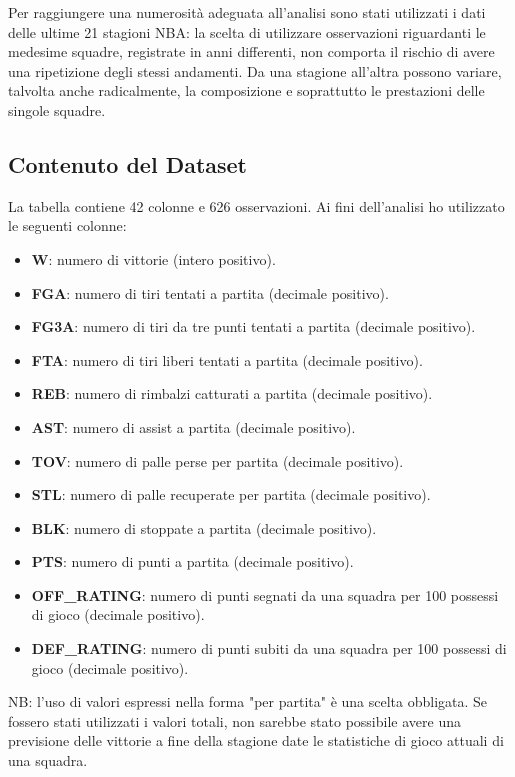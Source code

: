 \documentclass[11pt,a4paper]{article}
\begin{document}
Per raggiungere una numerosità adeguata all'analisi sono stati utilizzati i dati delle ultime 21 stagioni NBA: la scelta di utilizzare osservazioni riguardanti le medesime squadre, registrate in anni differenti, non comporta il rischio di avere una ripetizione degli stessi andamenti. Da una stagione all'altra possono variare, talvolta anche radicalmente, la composizione e soprattutto le prestazioni delle singole squadre. 

\subsection{Contenuto del Dataset}
La tabella contiene 42 colonne e 626 osservazioni. Ai fini dell'analisi ho utilizzato le seguenti colonne:
\begin{itemize}
    \item \textbf{W}: numero di vittorie (intero positivo).
    \item \textbf{FGA}: numero di tiri tentati a partita (decimale positivo).
    \item \textbf{FG3A}: numero di tiri da tre punti tentati a partita (decimale positivo).
    \item \textbf{FTA}: numero di tiri liberi tentati a partita (decimale positivo).
    \item \textbf{REB}: numero di rimbalzi catturati a partita (decimale positivo).
    \item \textbf{AST}: numero di assist a partita (decimale positivo).
    \item \textbf{TOV}: numero di palle perse per partita (decimale positivo).
    \item \textbf{STL}: numero di palle recuperate per partita (decimale positivo).
    \item \textbf{BLK}: numero di stoppate a partita (decimale positivo).
    \item \textbf{PTS}: numero di punti a partita (decimale positivo).
    \item \textbf{OFF\_RATING}: numero di punti segnati da una squadra per 100 possessi di gioco (decimale positivo).
    \item \textbf{DEF\_RATING}: numero di punti subiti da una squadra per 100 possessi di gioco (decimale positivo).
\end{itemize}

NB: l'uso di valori espressi nella forma "per partita" è una scelta obbligata. Se fossero stati utilizzati i valori totali, non sarebbe stato possibile avere una previsione delle vittorie a fine della stagione date le statistiche di gioco attuali di una squadra.
\end{document}
